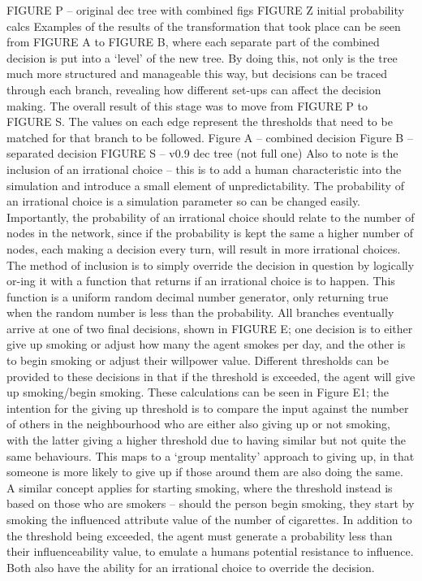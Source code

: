 \documentclass[]{report}
\begin{document}
FIGURE P – original dec tree with combined figs
FIGURE Z initial probability calcs
Examples of the results of the transformation that took place can be seen from FIGURE A to FIGURE B, where each separate part of the combined decision is put into a `level' of the new tree. By doing this, not only is the tree much more structured and manageable this way, but decisions can be traced through each branch, revealing how different set-ups can affect the decision making. The overall result of this stage was to move from FIGURE P to FIGURE S. The values on each edge represent the thresholds that need to be matched for that branch to be followed. 
Figure A – combined decision
Figure B – separated decision
FIGURE S – v0.9 dec tree (not full one)
Also to note is the inclusion of an irrational choice – this is to add a human characteristic into the simulation and introduce a small element of unpredictability. The probability of an irrational choice is a simulation parameter so can be changed easily. Importantly, the probability of an irrational choice should relate to the number of nodes in the network, since if the probability is kept the same a higher number of nodes, each making a decision every turn, will result in more irrational choices. The method of inclusion is to simply override the decision in question by logically or-ing it with a function that returns if an irrational choice is to happen. This function is a uniform random decimal number generator, only returning true when the random number is less than the probability. 
All branches eventually arrive at one of two final decisions, shown in FIGURE E; one decision is to either give up smoking or adjust how many the agent smokes per day, and the other is to begin smoking or adjust their willpower value. Different thresholds can be provided to these decisions in that if the threshold is exceeded, the agent will give up smoking/begin smoking. These calculations can be seen in Figure E1; the intention for the giving up threshold is to compare the input against the number of others in the neighbourhood who are either also giving up or not smoking, with the latter giving a higher threshold due to having similar but not quite the same behaviours. This maps to a `group mentality' approach to giving up, in that someone is more likely to give up if those around them are also doing the same. A similar concept applies for starting smoking, where the threshold instead is based on those who are smokers – should the person begin smoking, they start by smoking the influenced attribute value of the number of cigarettes. In addition to the threshold being exceeded, the agent must generate a probability less than their influenceability value, to emulate a humans potential resistance to influence. Both also have the ability for an irrational choice to override the decision. 
\end{document}
